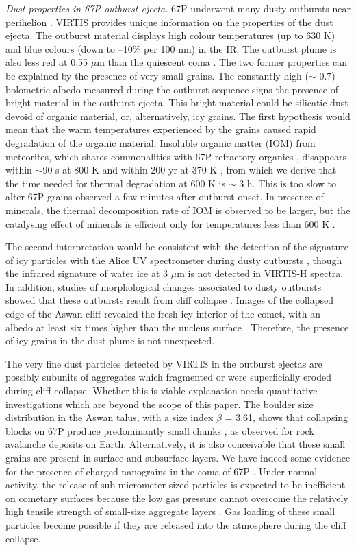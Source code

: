 \documentclass[a4paper,fleqn,usenatbib]{mnras}
\begin{document}
{\it Dust properties in 67P outburst ejecta.} 67P underwent many
dusty outbursts near perihelion \citep{Vincent2016b}. VIRTIS provides unique
information on the properties of the dust ejecta. The outburst material displays high colour temperatures (up to 630 K)
and blue colours (down to --10\% per 100 nm) in the IR. The
outburst plume is also less red at 0.55 $\mu$m than the quiescent
coma \citep{Rinaldi2017}. The two former properties can be
explained by the presence of very small grains. The constantly
high ($\sim$ 0.7) bolometric albedo measured during the outburst
sequence signs the presence of bright material in the outburst
ejecta. This bright material could be silicatic dust devoid of
organic material, or, alternatively, icy grains. The first
hypothesis would mean that the warm temperatures experienced by
the grains caused rapid degradation of the organic material. Insoluble organic
matter (IOM) from meteorites, which shares commonalities with 67P
refractory organics \citep{Fray2016}, disappears within $\sim$90 s
at 800 K and within 200 yr at 370 K \citep{Kebukawa2010}, from
which we derive that the time needed for thermal degradation at
600 K is $\sim$ 3 h. This is too slow to alter 67P grains observed
a few minutes after outburst onset. In presence of minerals, the
thermal decomposition rate of IOM is observed to be larger, but
the catalysing effect of minerals is efficient only for
temperatures less than 600 K \citep{Kebukawa2010}.
 

The second interpretation would be consistent with the detection of the signature of icy particles with the Alice UV spectrometer during dusty outbursts \citep{Steffl2016,Agarwal2017}, though the infrared signature of water ice at 3 $\mu$m is not detected in VIRTIS-H spectra. In addition, studies of morphological changes associated to dusty outbursts showed that these outbursts result from cliff collapse \citep{Pajola2017}. Images of the collapsed edge of the Aswan cliff revealed the fresh icy interior of the comet, with an albedo at least six times higher than the nucleus surface \citep{Pajola2017}. Therefore, the presence of icy grains in the dust plume is not unexpected. 

The very fine dust particles detected by VIRTIS in the outburst ejectas 
are possibly subunits of aggregates which fragmented or were superficially eroded during cliff collapse. Whether this is viable explanation needs quantitative investigations which are beyond the scope of this paper. The boulder size distribution in the Aswan talus, with a size index $\beta$ = 3.61, shows that collapsing blocks on 67P produce predominantly small chunks \citep{Pajola2017}, as observed for rock avalanche deposits on Earth.   Alternatively,  it is 
also conceivable that these small grains are present in surface and subsurface layers.
We have indeed some evidence for the presence of charged nanograins in the coma of 67P  \citep{Burch2015}. Under normal activity, the release of sub-micrometer-sized particles  is expected to be inefficient on cometary surfaces because the low gas pressure cannot overcome the relatively high tensile strength of small-size aggregate layers \citep{Gundlach2015}. Gas loading of these small particles become possible if they are released into the atmosphere during the cliff collapse.
           
\end{document}
